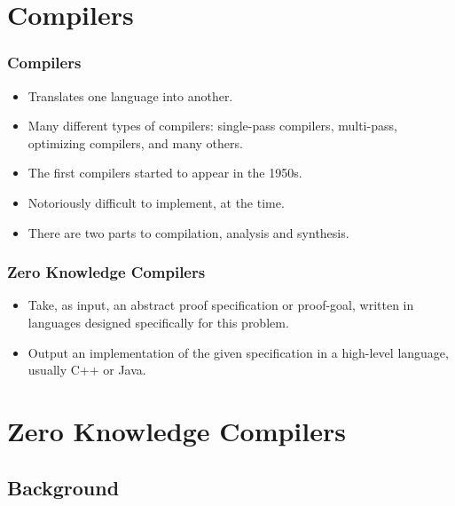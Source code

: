 \documentclass{beamer}
\begin{document}
\section{Compilers}

\begin{frame}
	\frametitle{Compilers}
	\begin{itemize}
		\item Translates one language into another. 
		\item Many different types of compilers: single-pass compilers, multi-pass, optimizing compilers, and many others.
		\item The first compilers started to appear in the 1950s.
		\item Notoriously difficult to implement, at the time.
		\item There are two parts to compilation, analysis and synthesis.
	\end{itemize}
\end{frame}

\begin{frame}
	\frametitle{Zero Knowledge Compilers}
	\begin{itemize}
		\item Take, as input, an abstract proof specification or proof-goal, 
		written in languages designed specifically for this problem.
		\item Output an implementation of the given specification in
    a high-level language, usually C++ or Java.
	\end{itemize}
\end{frame}

\section{Zero Knowledge Compilers}

\subsection{Background}
\end{document}
